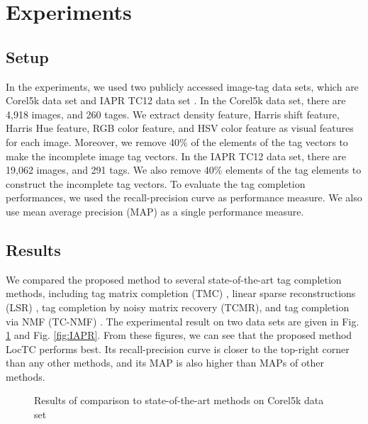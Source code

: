 \documentclass[runningheads,a4paper]{llncs}
\begin{document}
\section{Experiments}
\label{sec:exp}


\subsection{Setup}

In the experiments, we used two publicly accessed image-tag data sets, which are Corel5k data set \cite{Zhang2012838,Huang20103376,Wang20091643} and IAPR TC12 data set \cite{Zhang20151658,Li20132700,Zhang2012838}.
In the Corel5k data set, there are 4,918 images, and 260 tages. We extract density feature, Harris shift feature, Harris Hue feature, RGB color feature, and HSV color feature as visual features for each image. Moreover, we remove  40\% of the elements of the tag vectors to make the incomplete image tag vectors. In the IAPR TC12 data set, there are 19,062 images, and 291 tags. We also remove 40\% elements of the tag elements to construct the incomplete tag vectors.
To evaluate the tag completion performances, we used the recall-precision curve as performance measure.
We also use mean average precision (MAP) as a single performance measure.

\subsection{Results}

We compared the proposed method to several state-of-the-art tag completion methods, including tag matrix completion (TMC) \cite{Wu2013716}, linear sparse reconstructions (LSR) \cite{Lin201442}, tag completion by noisy matrix recovery (TCMR)\cite{Feng2014424}, and tag completion via NMF (TC-NMF) \cite{Xia2014}. The experimental result on two data sets are given in Fig. \ref{fig:Corel5k} and Fig. \ref{fig:IAPR}. From these figures, we can see that the proposed method LocTC performs best. Its recall-precision curve is closer to the top-right corner than any other methods, and its MAP is also higher than MAPs of other methods.

\begin{figure}[!htb]
\centering
{}
\caption{Results of comparison to state-of-the-art methods on Corel5k data set}
\label{fig:Corel5k}
\end{figure}
\end{document}
